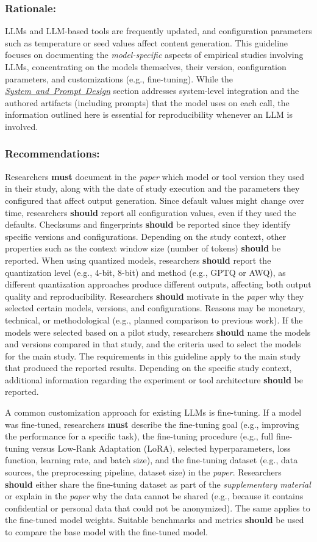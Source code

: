 \documentclass[smallextended]{svjour3}
\newcommand{\must}{\textbf{must}\xspace}
\newcommand{\should}{\textbf{should}\xspace}
\newcommand{\paper}{\emph{paper}\xspace}
\newcommand{\supplementarymaterial}{\emph{supplementary material}\xspace}
\newcommand{\paper}{\emph{paper}\xspace}
\newcommand{\supplementarymaterial}{\emph{supplementary material}\xspace}
\newcommand{\design}{\hyperref[sec:report-system-and-prompt-design]{\mbox{\emph{System and Prompt Design}}}\xspace}
\newcommand{\design}{\href{/guidelines/design/}{\emph{System and Prompt Design}}\xspace}
\newcommand{\guidelinesubsubsection}[1]{\subsubsection{\bfseries #1:}}
\newcommand{\guidelinesubsubsection}[1]{\subsubsection{#1}}
\begin{document}
\guidelinesubsubsection{Rationale}

LLMs and LLM-based tools are frequently updated, and configuration parameters such as temperature or seed values affect content generation. 
This guideline focuses on documenting the \emph{model-specific} aspects of empirical studies involving LLMs, concentrating on the models themselves, their version, configuration parameters, and customizations (e.g., fine-tuning). While the \design section addresses system-level integration and the authored artifacts (including prompts) that the model uses on each call, the information outlined here is essential for reproducibility whenever an LLM is involved.

\guidelinesubsubsection{Recommendations}

Researchers \must document in the \paper which model or tool version they used in their study, along with the date of study execution and the parameters they configured that affect output generation.
Since default values might change over time, researchers \should report all configuration values, even if they used the defaults.
Checksums and fingerprints \should be reported since they identify specific versions and configurations.
Depending on the study context, other properties such as the context window size (number of tokens) \should be reported.
When using quantized models, researchers \should report the quantization level (e.g., 4-bit, 8-bit) and method (e.g., GPTQ or AWQ), as different quantization approaches produce different outputs, affecting both output quality and reproducibility.
Researchers \should motivate in the \paper why they selected certain models, versions, and configurations.
Reasons may be monetary, technical, or methodological (e.g., planned comparison to previous work).
If the models were selected based on a pilot study, researchers \should name the models and versions compared in that study, and the criteria used to select the models for the main study. The requirements in this guideline apply to the main study that produced the reported results.
Depending on the specific study context, additional information regarding the experiment or tool architecture \should be reported.

A common customization approach for existing LLMs is fine-tuning.
If a model was fine-tuned, researchers \must describe the fine-tuning goal (e.g., improving the performance for a specific task), the fine-tuning procedure (e.g., full fine-tuning versus Low-Rank Adaptation (LoRA), selected hyperparameters, loss function, learning rate, and batch size), and the fine-tuning dataset (e.g., data sources, the preprocessing pipeline, dataset size) in the \paper.
Researchers \should either share the fine-tuning dataset as part of the \supplementarymaterial or explain in the \paper why the data cannot be shared (e.g., because it contains confidential or personal data that could not be anonymized).
The same applies to the fine-tuned model weights.
Suitable benchmarks and metrics \should be used to compare the base model with the fine-tuned model.
\end{document}
